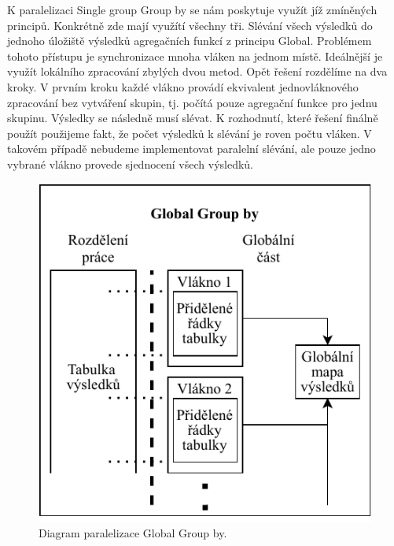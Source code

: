 K paralelizaci Single group Group by se nám poskytuje využít jíž zmíněných principů.
Konkrétně zde mají využítí všechny tři.
Slévání všech výsledků do jednoho úložiště výsledků agregačních funkcí z principu Global.
Problémem tohoto přístupu je synchronizace mnoha vláken na jednom místě.
Ideálnější je využít lokálního zpracování zbylých dvou metod.
Opět řešení rozdělíme na dva kroky. 
V prvním kroku každé vlákno provádí ekvivalent jednovláknového zpracování bez vytváření skupin, tj. počítá pouze agregační funkce pro jednu skupinu.
Výsledky se následně musí slévat.
K rozhodnutí, které řešení finálně použít použijeme fakt, že počet výsledků k slévání je roven počtu vláken.
V takovém případě nebudeme implementovat paralelní slévání, ale pouze jedno vybrané vlákno provede sjednocení všech výsledků.


\begin{figure}[!htp]
\includegraphics{../img/diaGlobalGr.pdf}\centering
\caption{Diagram paralelizace Global Group by.}
\label{figure.diaGlobalGr}
\end{figure}

